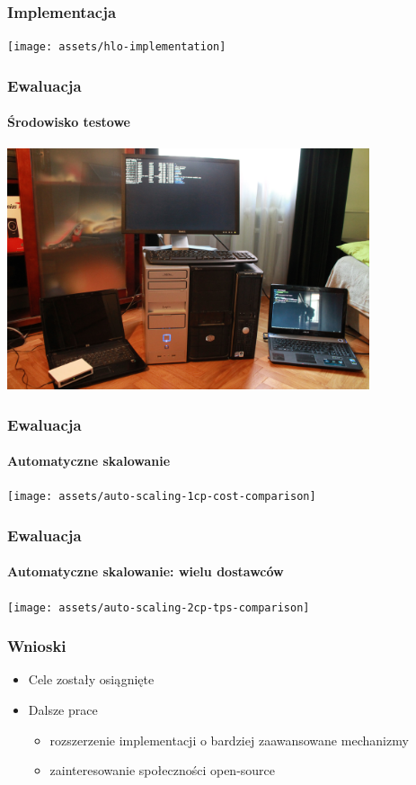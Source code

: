 \documentclass{beamer}
\begin{document}
\begin{frame}
\frametitle{Implementacja}

\vspace{2 mm}
\begin{center}
\texttt{[image: assets/hlo-implementation]}
\end{center}
\end{frame}



\begin{frame}
\frametitle{Ewaluacja}
\framesubtitle{Środowisko testowe}

\begin{center}

\includegraphics[width=0.8\textwidth]{assets/testbed}
\end{center}

\end{frame}




\begin{frame}
\frametitle{Ewaluacja}
\framesubtitle{Automatyczne skalowanie}

\begin{center}
\texttt{[image: assets/auto-scaling-1cp-cost-comparison]}
\end{center}


\end{frame}



\begin{frame}
\frametitle{Ewaluacja}
\framesubtitle{Automatyczne skalowanie: wielu dostawców}

\begin{center}
\texttt{[image: assets/auto-scaling-2cp-tps-comparison]}
\end{center}

\end{frame}

\begin{frame}
\frametitle{Wnioski}

\begin{itemize}
	\item Cele zostały osiągnięte
	\item Dalsze prace
		\begin{itemize}
			\item rozszerzenie implementacji o bardziej zaawansowane mechanizmy
			\item zainteresowanie społeczności open-source 
		\end{itemize}
\end{itemize}

\end{frame}
\end{document}
